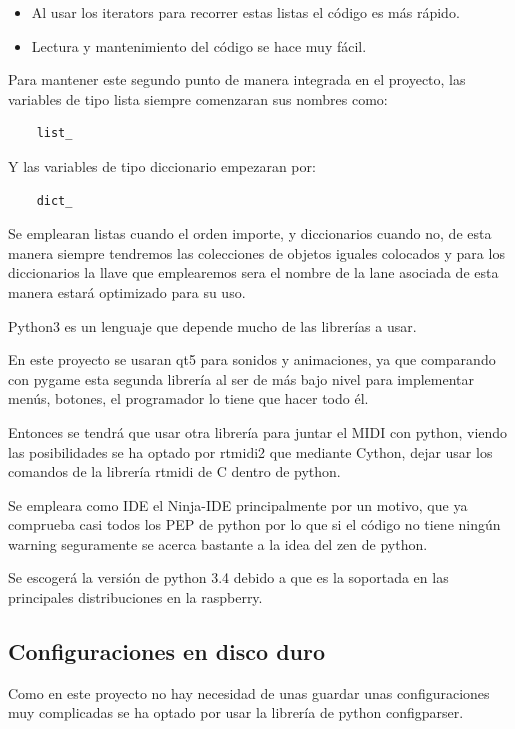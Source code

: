 \documentclass[a4paper,11pt,oneside]{book}
\begin{document}
 \begin{itemize}
   \item Al usar los iterators para recorrer estas listas el código es más rápido.
   \item Lectura y mantenimiento del código se hace muy fácil.
 \end{itemize}

  Para mantener este segundo punto de manera integrada en el proyecto, las variables de tipo lista siempre comenzaran sus nombres como:

\begin{lstlisting}
    list_
\end{lstlisting}
  
  
Y las variables de tipo diccionario empezaran por:

\begin{lstlisting}
    dict_
\end{lstlisting}
 
 Se emplearan listas cuando el orden importe, y diccionarios cuando no, de esta manera siempre tendremos las colecciones de objetos iguales colocados y para los diccionarios la llave que emplearemos sera el nombre de la lane asociada de esta manera estará optimizado para su uso.
 
 Python3 es un lenguaje que depende mucho de las librerías a usar.
 
 En este proyecto se usaran qt5 para sonidos y animaciones, ya que comparando con pygame esta segunda librería al ser de más bajo nivel para implementar menús, botones, el programador lo tiene que hacer todo él.
 
 Entonces se tendrá que usar otra librería para juntar el MIDI con python, viendo las posibilidades se ha optado por rtmidi2 que mediante Cython, dejar usar los comandos de la librería rtmidi de C dentro de python.


Se empleara como IDE el Ninja-IDE principalmente por un motivo, que ya comprueba casi todos los PEP de python por lo que si el código no tiene ningún warning seguramente se acerca bastante a la idea del zen de python.

Se escogerá la versión de python 3.4 debido a que es la soportada en las principales distribuciones en la raspberry.

\subsection{Configuraciones en disco duro}
Como en este proyecto no hay necesidad de unas guardar unas configuraciones muy complicadas se ha optado por usar la librería de python configparser.
\end{document}
